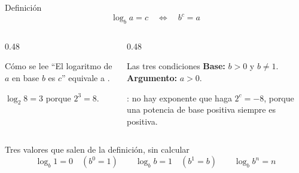 \documentclass[aspectratio=169,10pt]{beamer}
\begin{document}

\begin{frame}{Definición}
  \scriptsize
  \[ \boxed{\ \log_{b} a = c \quad\Longleftrightarrow\quad b^{c} = a\ } \]

  \vspace{0.08cm}
  \begin{columns}[T,onlytextwidth]
    \begin{column}{0.48\textwidth}
      \begin{block}{Cómo se lee}
        \tiny
        ``El logaritmo de $a$ en base $b$ es $c$'' equivale a
        .

        \vspace{0.08cm}
        $\log_{2}8 = 3$ porque $2^{3}=8$.
      \end{block}
    \end{column}
    \begin{column}{0.48\textwidth}
      \begin{alertblock}{Las tres condiciones}
        \tiny
        \textbf{Base:} $b > 0$ y $b \neq 1$. \\
        \textbf{Argumento:} $a > 0$.

        \vspace{0.06cm}
        : no
        hay exponente que haga $2^{c} = -8$, porque una potencia de base
        positiva siempre es positiva.
      \end{alertblock}
    \end{column}
  \end{columns}

  \vspace{0.1cm}
  \begin{exampleblock}{Tres valores que salen de la definición, sin calcular}
    \scriptsize
    \[ \log_{b} 1 = 0 \quad (b^{0}=1) \qquad
       \log_{b} b = 1 \quad (b^{1}=b) \qquad
       \log_{b} b^{n} = n \]
  \end{exampleblock}
\end{frame}
\end{document}
